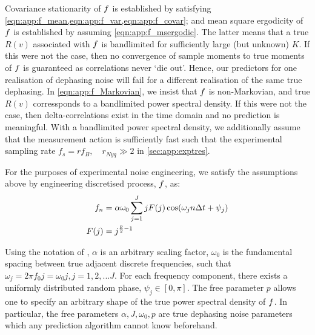 Covariance stationarity of $f$ is established by satisfying \cref{eqn:app:f_mean,eqn:app:f_var,eqn:app:f_covar}; and mean square ergodicity  of $f$ is established by assuming \cref{eqn:app:f_msergodic}. The latter means that a true $R(v)$ associated with $f$ is bandlimited for sufficiently large (but unknown) $K$. If this were not the case, then no convergence of sample moments to true moments of $f$ is guaranteed as correlations never `die out'. Hence, our predictors for one realisation of dephasing noise will fail for a different realisation of the same true dephasing. In \cref{eqn:app:f_Markovian}, we insist that $f$ is non-Markovian, and true $R(v)$ corressponds to a bandlimited power spectral density. If this were not the case, then delta-correlations exist in the time domain and no prediction is meaningful. With a bandlimited power spectral density, we additionally assume that the measurement action is sufficiently fast such that the experimental sampling rate $f_s = rf_B, \quad r_{Nyq} \gg 2$ in \cref{sec:app:exptres}.

For the purposes of experimental noise engineering, we satisfy the assumptions above by engineering discretised process, $f$, as:
\begin{align}
f_n &= \alpha \omega_0 \sum_{j=1}^{J} j F(j)\cos(\omega_j n \Delta t + \psi_j) \label{eqn:app:noiseengineering} \\
F(j) & = j^{\frac{p}{2}-1} 
\end{align}

Using the notation of \cite{soare2014}, $\alpha$ is an arbitrary scaling factor, $\omega_0$ is the fundamental spacing between true adjacent discrete frequencies, such that $\omega_j = 2 \pi f_0 j =\omega_0 j, j = 1, 2, ...J$. For each frequency component, there exists a uniformly distributed random phase, $\psi_j \in [0, \pi]$. The free parameter $p$ allows one to specify an arbitrary shape of the true power spectral density of $f$. In particular, the free parameters $\alpha, J, \omega_0, p$ are true dephasing noise parameters which any prediction algorithm cannot know beforehand.

